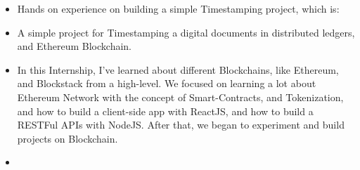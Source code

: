 \documentclass[10pt,a4paper]{altacv}
\begin{document}
\begin{itemize}
\item Hands on experience on building a simple Timestamping project, which is:
\end{itemize}

\begin{mdframed}
\begin{itemize}
  \item A simple project for Timestamping a digital documents in distributed ledgers, and Ethereum Blockchain.   
\end{itemize}

\end{mdframed}


\begin{itemize}
\item In this Internship, I've learned about different Blockchains, like Ethereum, and Blockstack from a high-level. We focused on learning a lot about Ethereum Network with the concept of Smart-Contracts, and Tokenization, and how to build a client-side app with ReactJS, and how to build a RESTFul APIs with NodeJS. After that, we began to experiment and build projects on Blockchain.
\end{itemize}
\divider


\begin{itemize}
  \item {}
\end{itemize}
\end{document}
